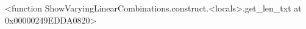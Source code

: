 \documentclass[preview]{standalone}
\begin{document}
\begin{center}
<function ShowVaryingLinearCombinations.construct.<locals>.get_len_txt at 0x00000249EDDA0820>
\end{center}
\end{document}
